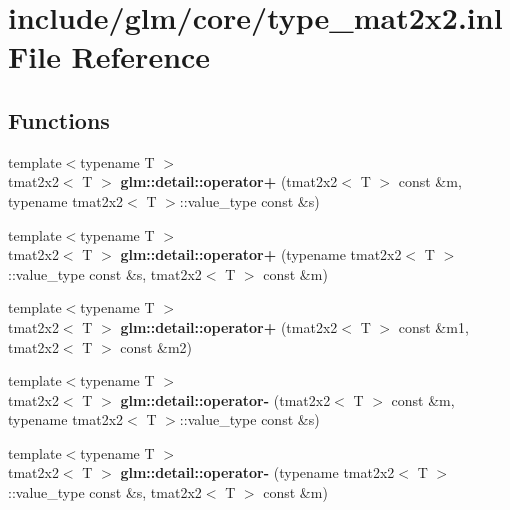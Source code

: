 \hypertarget{type__mat2x2_8inl}{\section{include/glm/core/type\-\_\-mat2x2.inl \-File \-Reference}
\label{type__mat2x2_8inl}
}
\subsection*{\-Functions}
\begin{DoxyCompactItemize}
\item 
\hypertarget{namespaceglm_1_1detail_a3b2203a190066a4844d0b986af997679}{{\footnotesize template$<$typename T $>$ }\\tmat2x2$<$ \-T $>$ {\bfseries glm\-::detail\-::operator+} (tmat2x2$<$ \-T $>$ const \&m, typename tmat2x2$<$ \-T $>$\-::value\-\_\-type const \&s)}\label{namespaceglm_1_1detail_a3b2203a190066a4844d0b986af997679}

\item 
\hypertarget{namespaceglm_1_1detail_a8f0923e9dc75f947a9f73a90e17f410a}{{\footnotesize template$<$typename T $>$ }\\tmat2x2$<$ \-T $>$ {\bfseries glm\-::detail\-::operator+} (typename tmat2x2$<$ \-T $>$\-::value\-\_\-type const \&s, tmat2x2$<$ \-T $>$ const \&m)}\label{namespaceglm_1_1detail_a8f0923e9dc75f947a9f73a90e17f410a}

\item 
\hypertarget{namespaceglm_1_1detail_a9d2f8021d65857e7b2e479a6727799b3}{{\footnotesize template$<$typename T $>$ }\\tmat2x2$<$ \-T $>$ {\bfseries glm\-::detail\-::operator+} (tmat2x2$<$ \-T $>$ const \&m1, tmat2x2$<$ \-T $>$ const \&m2)}\label{namespaceglm_1_1detail_a9d2f8021d65857e7b2e479a6727799b3}

\item 
\hypertarget{namespaceglm_1_1detail_ad70fbe9f78181432a7344d896b669e7e}{{\footnotesize template$<$typename T $>$ }\\tmat2x2$<$ \-T $>$ {\bfseries glm\-::detail\-::operator-\/} (tmat2x2$<$ \-T $>$ const \&m, typename tmat2x2$<$ \-T $>$\-::value\-\_\-type const \&s)}\label{namespaceglm_1_1detail_ad70fbe9f78181432a7344d896b669e7e}

\item 
\hypertarget{namespaceglm_1_1detail_ad7acbe21e10241998566a5f97012feae}{{\footnotesize template$<$typename T $>$ }\\tmat2x2$<$ \-T $>$ {\bfseries glm\-::detail\-::operator-\/} (typename tmat2x2$<$ \-T $>$\-::value\-\_\-type const \&s, tmat2x2$<$ \-T $>$ const \&m)}\label{namespaceglm_1_1detail_ad7acbe21e10241998566a5f97012feae}


\end{DoxyCompactItemize}

